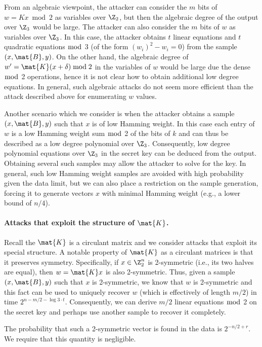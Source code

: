 From an algebraic viewpoint, the attacker can consider the $m$ bits of $w = K x \bmod 2$ as variables over $\Z_2$,
but then the algebraic degree of the output over $\Z_3$ would be large.
The attacker can also consider the $m$ bits of $w$ as variables over $\Z_3$.
In this case, the attacker obtains $t$ linear equations and $t$ quadratic equations $\bmod$ 3 (of the form $(w_i)^2 - w_i = 0$) from the sample $(x,\mat{B},y)$.
On the other hand, the algebraic degree of $w' = \mat{K} (x +\delta) \bmod 2$ in the variables of $w$ would be large due the dense $\bmod$ 2 operations,
hence it is not clear how to obtain additional low degree equations.
In general, such algebraic attacks do not seem more efficient than the attack described above for enumerating $w$ values.

Another scenario which we consider is when the attacker obtains a sample $(x,\mat{B},y)$
such that $x$ is of low Hamming weight. In this case each entry of $w$ is a low Hamming weight sum $\bmod$ 2
of the bits of $k$ and can thus be described as a low degree polynomial over $\Z_3$.
Consequently, low degree polynomial equations over $\Z_3$ in the secret key can be deduced from the output.
Obtaining several such samples may allow the attacker to solve for the key.
In general, such low Hamming weight samples are avoided with high probability given the data limit,
but we can also place a restriction on the sample generation, forcing it to generate vectors $x$
with minimal Hamming weight (e.g., a lower bound of $n/4$).


\paragraph{Attacks that exploit the structure of $\mat{K}$.}
Recall the $\mat{K}$ is a circulant matrix and we consider attacks that exploit its
special structure. A notable property of $\mat{K}$ as a circulant matrices is that it preserves symmetry.
Specifically, if $x \in \Z_2^n$ is 2-symmetric (i.e., its two halves are equal),
then $w = \mat{K}x$ is also 2-symmetric. Thus, given a sample $(x,\mat{B},y)$
such that $x$ is 2-symmetric, we know that $w$ is 2-symmetric and this fact can be used to
uniquely recover $w$ (which is effectively of length $m/2$) in time $2^{n - m/2 - \log 3 \cdot t}$.
Consequently, we can derive $m/2$ linear equations $\bmod$ 2 on the secret key
and perhaps use another sample to recover it completely.

The probability that such a 2-symmetric vector is found in the data is $2^{-n/2 + r}$.
We require that this quantity is negligible.

